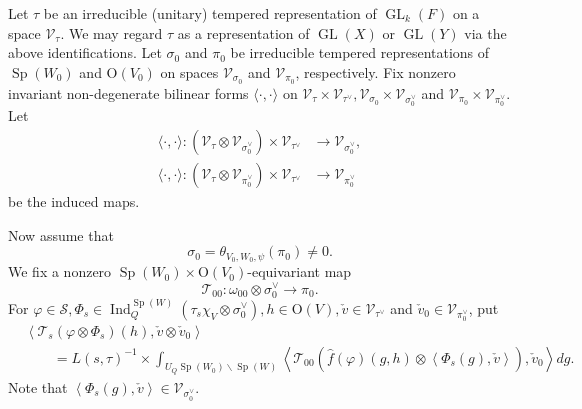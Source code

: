 \documentclass[article]{article}
\numberwithin{equation}{section}
\theoremstyle{definition}
\DeclareMathOperator{\Ind}{Ind}
\DeclareMathOperator{\GL}{GL}
\DeclareMathOperator{\SP}{Sp}
\begin{document}
Let $\tau$ be an irreducible (unitary) tempered representation of $\GL_{k}(F)$ on a space $\mathscr{V}_{\tau}$. We may regard $\tau$ as a representation of $\GL(X)$ or $\GL(Y)$ via the above identifications. Let $\sigma_0$ and $\pi_0$ be irreducible tempered representations of $\SP(W_0)$ and $\mathrm{O}(V_0)$ on spaces $\mathscr{V}_{\sigma_0}$ and $\mathscr{V}_{\pi_0}$, respectively. Fix nonzero invariant non-degenerate bilinear forms $\langle\cdot, \cdot\rangle$ on $\mathscr{V}_{\tau} \times \mathscr{V}_{\tau^ {\vee}}, \mathscr{V}_{\sigma_0} \times \mathscr{V}_{\sigma_{0}^{\vee}}$ and $\mathscr{V}_{\pi_0} \times \mathscr{V}_{\pi_{0}^{\vee}}$. Let
\begin{align*}
\langle\cdot, \cdot\rangle :\left(\mathscr{V}_{\tau} \otimes \mathscr{V}_{\sigma_{0}^{\vee}}\right) \times \mathscr{V}_{\tau^{\vee}} &\rightarrow \mathscr{V}_{\sigma_{0}^{\vee}},\\
\langle\cdot, \cdot\rangle :\left(\mathscr{V}_{\tau} \otimes \mathscr{V}_{\pi_{0}^{\vee}}\right) \times \mathscr{V}_{\tau^{\vee}} &\rightarrow \mathscr{V}_{\pi_{0}^{\vee}}
\end{align*}
be the induced maps. 

Now assume that 
$$
\sigma_0=\theta_{V_0,W_0,\psi}(\pi_0)\neq 0. 
$$
We fix a nonzero $\SP(W_0)\times \mathrm O(V_0)$-equivariant map 
$$
\mathcal{T}_{00} : \omega_{00} \otimes \sigma_{0}^{\vee} \rightarrow \pi_0. 
$$
For $\varphi\in \mathscr S, \Phi_{s}\in \Ind_{Q}^{\SP(W)}(\tau_s\chi_V\otimes \sigma_{0}^{\vee}), h\in \mathrm O(V),\check{v}\in \mathscr{V}_{\tau^{\vee}}$ and $\check{v}_{0}\in \mathscr{V}_{\pi_{0}^{\vee}}$, put 
\begin{align*}
&\left\langle\mathcal{T}_{s}\left(\varphi\otimes \Phi_{s}\right)(h), \check{v} \otimes \check{v}_{0}\right\rangle\\
&\qquad=L(s, \tau)^{-1} \times \int_{U_{Q} \SP(W_0) \backslash \SP\left(W\right)}\left\langle\mathcal{T}_{00}(\hat{f}(\varphi)\left(g, h\right)\otimes \left\langle\Phi_{s}\left(g\right), \check{v}\right\rangle), \check{v}_{0}\right\rangle d g.
\end{align*}
Note that $\left\langle\Phi_{s}\left(g\right), \check{v}\right\rangle \in \mathscr{V}_{\sigma_{0}^{\vee}}$. 
\end{document}
